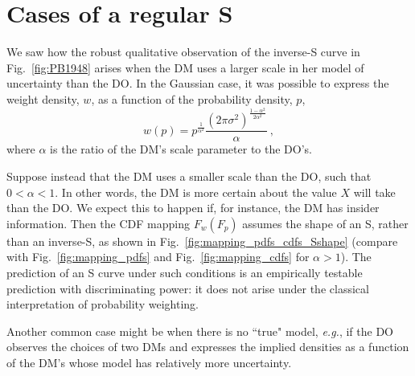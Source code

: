\documentclass[12pt,letter,timesnewroman]{article}
\newcommand{\fref}[1]{Fig.~\ref{fig:#1}}
\newcommand{\seclabel}[1]{\label{sec:#1}}
\newcommand{\eg}{\textit{e.g.}}
\newcommand{\be}{\begin{equation}}
\newcommand{\ee}{\end{equation}}
\begin{document}
\newpage
\printbibliography

\appendix

\newpage
\section{Cases of a regular S}
\seclabel{Scurve}

We saw how the robust qualitative observation of the inverse-S curve in \fref{PB1948} arises when the DM uses a larger scale in her model of uncertainty than the DO. In the Gaussian case, it was possible to express the weight density, $w$, as a function of the probability density, $p$,
\be
w(p)= p^{\frac{1}{\alpha^2}} \frac{\left(2\pi\sigma^2\right)^{\frac{1-\alpha^2}{2\alpha^2}}}{\alpha} ~,
\ee
where $\alpha$ is the ratio of the DM's scale parameter to the DO's.

Suppose instead that the DM uses a smaller scale than the DO, such that $0<\alpha<1$. In other words, the DM is more certain about the value $X$ will take than the DO. We expect this to happen if, for instance, the DM has insider information. Then the CDF mapping $F_w(F_p)$ assumes the shape of an S, rather than an inverse-S, as shown in \fref{mapping_pdfs_cdfs_Sshape} (compare with \fref{mapping_pdfs} and \fref{mapping_cdfs} for $\alpha>1$). The prediction of an S curve under such conditions is an empirically testable prediction with discriminating power: it does not arise under the classical interpretation of probability weighting.

Another common case might be when there is no ``true" model, \eg, if the DO observes the choices of two DMs and expresses the implied densities as a function of the DM's whose model has relatively more uncertainty.
\end{document}
